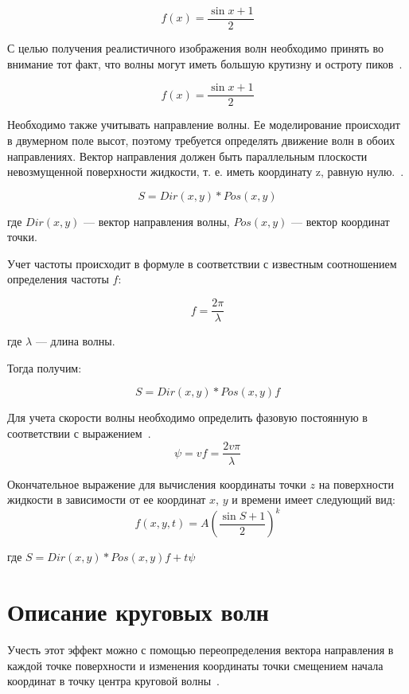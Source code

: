 \begin{equation}
    f(x) = \dfrac{\sin{x} + 1}{2}
\end{equation}

С целью получения реалистичного изображения волн необходимо принять во внимание тот факт, 
что волны могут иметь большую крутизну и остроту пиков~\cite{WAVE}.

\begin{equation}
    f(x) = \dfrac{\sin{x} + 1}{2}
\end{equation}

Необходимо также учитывать направление волны. Ее моделирование происходит в двумерном поле высот, 
поэтому требуется определять движение волн в обоих направлениях. Вектор направления должен быть 
параллельным плоскости невозмущенной поверхности жидкости, т. е. иметь координату z, равную нулю.~\cite{WAVE}.

\begin{equation}
    S = Dir(x,y)*Pos(x,y)
\end{equation}

где $Dir(x, y)$ — вектор направления волны, $Pos(x, y)$ — вектор координат точки.

Учет частоты происходит в формуле в соответствии с известным соотношением определения частоты $f$:

\begin{equation}
    f = \dfrac{2\pi}{\lambda}
\end{equation}

где $\lambda$ — длина волны.

Тогда получим:

\begin{equation}
    S = Dir(x,y)*Pos(x,y)f
\end{equation}

Для учета скорости волны необходимо определить фазовую постоянную в соответствии с выражением~\cite{WAVE}.
\begin{equation}
    \psi = vf = \dfrac{2v\pi}{\lambda}
\end{equation}

Окончательное выражение для вычисления координаты точки $z$ на поверхности жидкости 
в зависимости от ее координат $x$, $y$ и времени имеет следующий вид:
\begin{equation}
    f(x,y,t) = A\left(\dfrac{\sin{S} + 1}{2}\right)^k
\end{equation}

где $S = Dir(x, y)*Pos(x, y)f + t\psi$

\section{Описание круговых волн}
Учесть этот эффект можно с помощью переопределения вектора направления в каждой точке поверхности 
и изменения координаты точки смещением начала координат в точку центра круговой волны~\cite{WAVE}.

